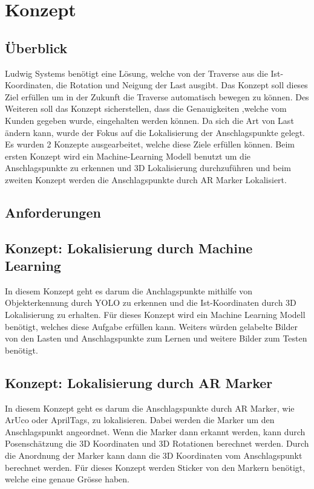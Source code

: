 \section{Konzept}


\subsection{Überblick}
Ludwig Systems benötigt eine Lösung, welche von der Traverse aus die Ist-Koordinaten, die Rotation und Neigung der Last ausgibt. Das Konzept soll dieses Ziel erfüllen um in der Zukunft die Traverse automatisch bewegen zu können. Des Weiteren soll das Konzept sicherstellen, dass die Genauigkeiten ,welche vom Kunden gegeben wurde, eingehalten werden können. 
Da sich die Art von Last ändern kann, wurde der Fokus auf die Lokalisierung der Anschlagspunkte gelegt. 
Es wurden 2 Konzepte ausgearbeitet, welche diese Ziele erfüllen können. Beim ersten Konzept wird ein Machine-Learning Modell benutzt um die Anschlagspunkte zu erkennen und 3D Lokalisierung durchzuführen und beim zweiten Konzept werden die Anschlagspunkte durch AR Marker 
Lokalisiert.

\subsection{Anforderungen}\label{requirements}


\subsection{Konzept: Lokalisierung durch Machine Learning}

In diesem Konzept geht es darum die Anchlagspunkte mithilfe von Objekterkennung durch YOLO zu erkennen und die Ist-Koordinaten durch 3D Lokalisierung zu erhalten. 
Für dieses Konzept wird ein Machine Learning Modell benötigt, welches diese Aufgabe erfüllen kann. 
Weiters würden gelabelte Bilder von den Lasten und Anschlagspunkte zum Lernen und weitere Bilder zum Testen benötigt.

\subsection{Konzept: Lokalisierung durch AR Marker}

In diesem Konzept geht es darum die Anschlagspunkte durch AR Marker, wie ArUco oder AprilTags, zu lokalisieren. Dabei werden die Marker um den Anschlagspunkt angeordnet. Wenn die Marker dann erkannt werden, kann durch Posenschätzung die 3D Koordinaten und 3D Rotationen berechnet werden. Durch die Anordnung der Marker kann dann die 3D Koordinaten vom Anschlagspunkt berechnet werden. 
Für dieses Konzept werden Sticker von den Markern benötigt, welche eine genaue Grösse haben. 

